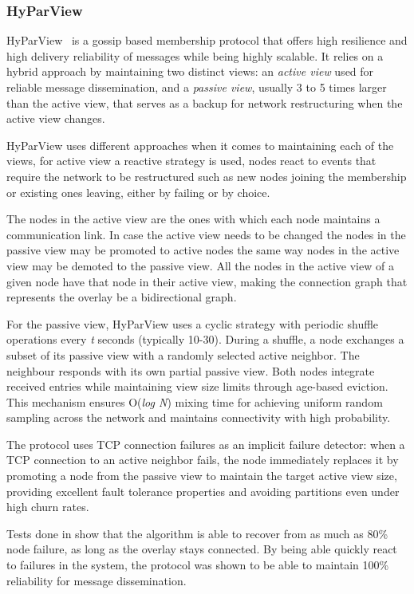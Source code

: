 \subsubsection{HyParView}\label{subsec:hyparview}

HyParView~\cite{hyparview} is a gossip based membership protocol that offers high
resilience and high delivery reliability of messages while being highly scalable.
It relies on a hybrid approach by maintaining two distinct views: an \textit{active view}
used for reliable message dissemination, and a \textit{passive view},
usually 3 to 5 times larger than the active view,
that serves as a backup for network restructuring when the active view changes.

HyParView uses different approaches when it comes to maintaining each of the views,
for active view a reactive strategy is used, nodes react to events that require 
the network to be restructured such as new nodes joining the membership or
existing ones leaving, either by failing or by choice.

The nodes in the active view are the ones with which each node maintains a
communication link. In case the active view needs to be changed the nodes in
the passive view may be promoted to active nodes the same way nodes in the
active view may be demoted to the passive view. All the nodes in the active
view of a given node have that node in their active view, making the connection
graph that represents the overlay be a bidirectional graph.

For the passive view, HyParView uses a cyclic strategy with periodic shuffle operations
every \textit{t} seconds (typically 10-30). During a shuffle, a node exchanges
a subset of its passive view with a randomly selected active neighbor.
The neighbour responds with its own partial passive view. Both nodes
integrate received entries while maintaining view size limits through age-based eviction.
This mechanism ensures O(\textit{log N}) mixing time for achieving uniform random sampling
across the network and maintains connectivity with high probability.

The protocol uses TCP connection failures as an implicit failure detector: when a TCP
connection to an active neighbor fails, the node immediately replaces it by promoting
a node from the passive view to maintain the target active view size, providing
excellent fault tolerance properties and avoiding partitions even under high churn rates.

Tests done in \cite{hyparview} show that the algorithm is able to recover from as much as 80\%
node failure, as long as the overlay stays connected. By being able quickly react to failures
in the system, the protocol was shown to be able to maintain 100\% reliability 
for message dissemination.


